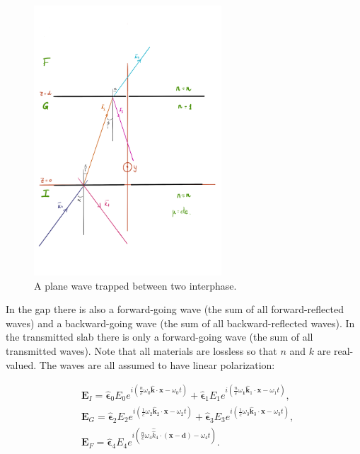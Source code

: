 \begin{figure}[h!]
	\includegraphics[width=7cm]{figures/Sandwich.png}
	\centering
	\caption{A plane wave trapped between two interphase.}
\end{figure}

In the gap there is also a forward-going wave (the sum of all forward-reflected waves) and a backward-going wave (the sum of all backward-reflected waves). In the transmitted slab there is only a forward-going wave (the sum of all transmitted waves). Note that all materials are lossless so that $n$ and $k$ are real-valued. The waves are all assumed to have linear polarization:

\begin{equation}
	\begin{split}
		&\mathbf{E}_{I}=\hat{\boldsymbol{\epsilon}}_{0} E_{0} e^{i\left(\frac{n}{c} \omega_{0} \hat{\mathbf{k}} \cdot \mathbf{x}-\omega_{0} t\right)}+\hat{\boldsymbol{\epsilon}}_{1} E_{1} e^{i\left(\frac{n}{c} \omega_{\mathbf{1}} \hat{\mathbf{k}}_{1} \cdot \mathbf{x}-\omega_{1} t\right)}, \\
		&\mathbf{E}_{G}=\hat{\boldsymbol{\epsilon}}_{2} E_{2} e^{i\left(\frac{1}{c} \omega_{2} \hat{\mathbf{k}}_{2} \cdot \mathbf{x}-\omega_{2} t\right)}+\hat{\boldsymbol{\epsilon}}_{3} E_{3} e^{i\left(\frac{1}{c} \omega_{3} \hat{\mathbf{k}}_{3} \cdot \mathbf{x}-\omega_{3} t\right)}, \\
		&\mathbf{E}_{F}=\hat{\boldsymbol{\epsilon}}_{4} E_{4} e^{i\left(\frac{n}{c} \omega_{4} \hat{\hat{k}}_{4} \cdot(\mathbf{x}-\mathbf{d})-\omega_{4} t\right)}.
	\end{split}
\end{equation}

